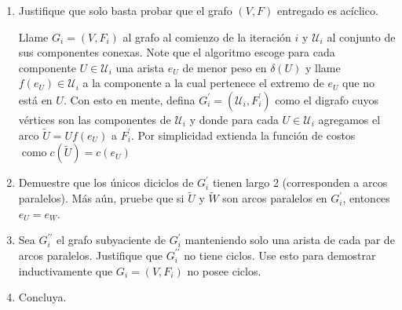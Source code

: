 \begin{enumerate}[label ={\bf P\arabic*}]
	\begin{enumerate}
		\item Justifique que solo basta probar que el grafo $(V, F)$ entregado es acíclico.
		
		Llame $G_{i}=\left(V, F_{i}\right)$ al grafo al comienzo de la iteración $i$ y $\mathcal{U}_{i}$ al conjunto de sus componentes conexas. Note que el algoritmo escoge para cada componente $U \in \mathcal{U}_{i}$ una arista $e_{U}$ de menor peso en $\delta(U)$ y llame $f\left(e_{U}\right) \in \mathcal{U}_{i}$ a la componente a la cual pertenece el extremo de $e_{U}$ que no está en $U$. Con esto en mente, defina $G_{i}^{\prime}=\left(\mathcal{U}_{i}, F_{i}^{\prime}\right)$ como el digrafo cuyos vértices son las componentes de $\mathcal{U}_{i}$ y donde para cada $U \in \mathcal{U}_{i}$ agregamos el arco $\tilde{U}=U f\left(e_{U}\right)$ a $F_{i}^{\prime}$. Por simplicidad extienda la función de costos $\operatorname{como} c(\tilde{U})=c\left(e_{U}\right)$
		\item Demuestre que los únicos diciclos de $G_{i}^{\prime}$ tienen largo 2 (corresponden a arcos paralelos). Más aún, pruebe que si $\tilde{U}$ y $\tilde{W}$ son arcos paralelos en $G_{i}^{\prime}$, entonces $e_{U}=e_{W}$.
		\item Sea $G_{i}^{\prime \prime}$ el grafo subyaciente de $G_{i}^{\prime}$ manteniendo solo una arista de cada par de arcos paralelos. Justifique que $G_{i}^{\prime \prime}$ no tiene ciclos. Use esto para demostrar inductivamente que $G_{i}=\left(V, F_{i}\right)$ no posee ciclos.
		\item Concluya.
	\end{enumerate}
	
	
\end{enumerate}
